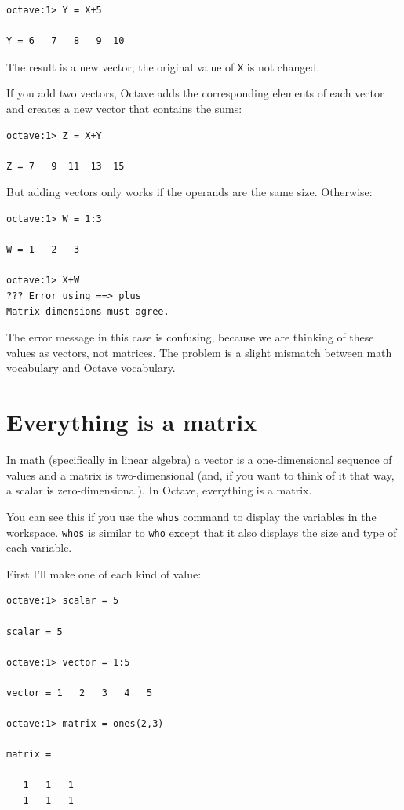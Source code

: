 \documentclass{book}
\begin{document}
\begin{verbatim}
octave:1> Y = X+5

Y = 6   7   8   9  10
\end{verbatim}

The result is a new vector; the original value of {\tt X} is not
changed.

If you add two vectors, Octave adds the corresponding elements of each
vector and creates a new vector that contains the sums:

\begin{verbatim}
octave:1> Z = X+Y

Z = 7   9  11  13  15
\end{verbatim}

But adding vectors only works if the operands are the same size.
Otherwise:

\begin{verbatim}
octave:1> W = 1:3

W = 1   2   3

octave:1> X+W
??? Error using ==> plus
Matrix dimensions must agree.
\end{verbatim}

The error message in this case is confusing, because we are thinking
of these values as vectors, not matrices. The problem is a slight
mismatch between math vocabulary and Octave vocabulary.


\section{Everything is a matrix}

In math (specifically in linear algebra) a vector is a one-dimensional
sequence of values and a matrix is two-dimensional (and, if you want
to think of it that way, a scalar is zero-dimensional). In Octave,
everything is a matrix.

You can see this if you use the {\tt whos} command to display the
variables in the workspace. {\tt whos} is similar to {\tt who} except
that it also displays the size and type of each variable.

First I'll make one of each kind of value:

\begin{verbatim}
octave:1> scalar = 5

scalar = 5

octave:1> vector = 1:5

vector = 1   2   3   4   5

octave:1> matrix = ones(2,3)

matrix =

   1   1   1
   1   1   1
\end{verbatim}
\end{document}
